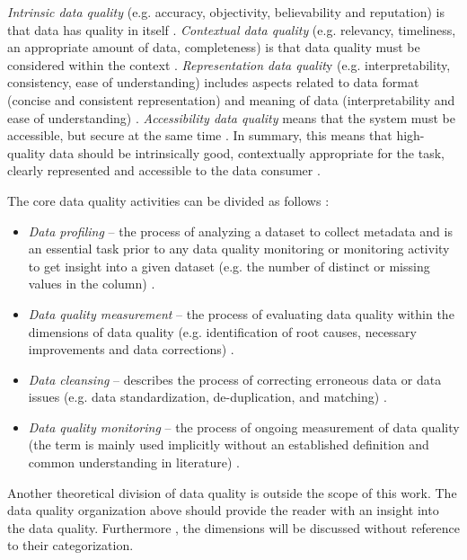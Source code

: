 			\emph{Intrinsic data quality} (e.g. accuracy, objectivity, believability and reputation) is that data has quality in itself \cite{Wang1996}. \emph{Contextual data quality} (e.g. relevancy, timeliness, an appropriate amount of data, completeness) is that data quality must be considered within the context \cite{Wang1996}. \emph{Representation data qualit}y (e.g. interpretability, consistency, ease of understanding) includes aspects related to data format (concise and consistent representation) and meaning of data (interpretability and ease of understanding) \cite{Wang1996}. \emph{Accessibility data quality} means that the system must be accessible, but secure at the same time \cite{Wang1996}. In summary, this means that high-quality data should be intrinsically good, contextually appropriate for the task, clearly represented and accessible to the data consumer \cite{Wang1996}.
	
			The core data quality activities can be divided as follows \cite{Ehrlinger2019}:
			
			\begin{itemize}
				\item \emph{Data profiling} -- the process of analyzing a dataset to collect metadata and is an essential task prior to any data quality monitoring or monitoring activity to get insight into a given dataset (e.g. the number of distinct or missing values in the column) \cite{Ehrlinger2019}.
				\item \emph{Data quality measurement} -- the process of evaluating data quality within the dimensions of data quality (e.g. identification of root causes, necessary improvements and data corrections)  \cite{McGilvray2008}.
				\item \emph{Data cleansing} -- describes the process of correcting erroneous data or data issues (e.g. data standardization, de-duplication, and matching) \cite{Ehrlinger2019}.
				\item \emph{Data quality monitoring} -- the process of ongoing measurement of data quality (the term is mainly used implicitly without an established definition and common understanding in literature) \cite{Ehrlinger2019}.
			\end{itemize}
			
			Another theoretical division of data quality is outside the scope of this work. The data quality organization above should provide the reader with an insight into the data quality. Furthermore , the dimensions will be discussed without reference to their categorization. 
																			
